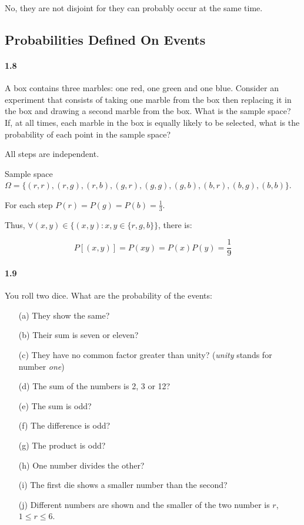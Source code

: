 \begin{solution}

No, they are not disjoint for they can probably occur at the same time.

\end{solution}

\subsection{Probabilities Defined On Events}

\paragraph{1.8}
A box contains three marbles: one red, one green and one blue. Consider an experiment that consists of taking one marble from the box then replacing it in the box and drawing a second marble from the box. What is the sample space? If, at all times, each marble in the box is equally likely to be selected, what is the probability of each point in the sample space?

\begin{solution}

All steps are independent.

Sample space $\Omega = \{(r,r), (r,g), (r,b), (g,r), (g,g), (g,b), (b,r), (b,g), (b,b)\}$.

For each step $P(r) = P(g) = P(b) = \frac{1}{3}$.

Thus, $\forall(x, y)\in \{(x,y):x, y\in\{r, g, b\}\}$, there is:

\begin{equation*}
    P[(x, y)] = P(xy) = P(x)P(y) = \frac{1}{9}
\end{equation*}

\end{solution}

\paragraph{1.9}
You roll two dice. What are the probability of the events:

\begin{itemize}
    \item[(a)] They show the same?
    \item[(b)] Their sum is seven or eleven?
    \item[(c)] They have no common factor greater than unity? (\textit{unity} stands for number \textit{one})
    \item[(d)] The sum of the numbers is 2, 3 or 12?
    \item[(e)] The sum is odd?
    \item[(f)] The difference is odd?
    \item[(g)] The product is odd?
    \item[(h)] One number divides the other?
    \item[(i)] The first die shows a smaller number than the second?
    \item[(j)] Different numbers are shown and the smaller of the two number is $r$, $1\leq r\leq 6$.
\end{itemize}


